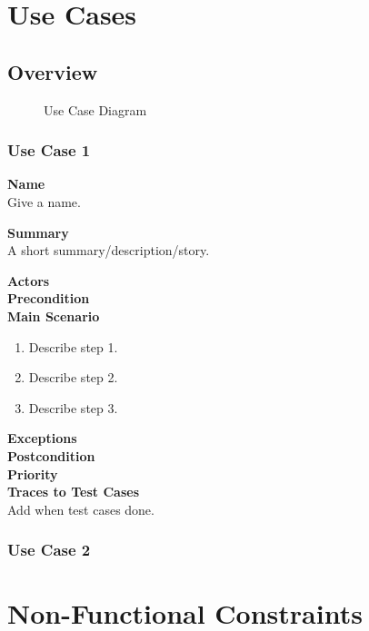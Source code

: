 \documentclass[12pt]{article}
\begin{document}
\section{Use Cases}

\subsection{Overview}

\begin{figure}[htbp]
\caption{Use Case Diagram}
\label{fig:use-case-diagram}
\end{figure}

\subsubsection{Use Case 1} \label{uc:1}

\noindent
{\bf Name}\\
Give a name.

\noindent
{\bf Summary}\\
A short summary/description/story.

\noindent
{\bf Actors}\\

\noindent
{\bf Precondition}\\

\noindent
{\bf Main Scenario}\\
\vspace*{-0.2in}
\begin{enumerate}
\item Describe step 1.
\item Describe step 2.
\item Describe step 3.
\end{enumerate}

\noindent
{\bf Exceptions}\\

\noindent
{\bf Postcondition}\\

\noindent
{\bf Priority}\\

\noindent
{\bf Traces to Test Cases}\\
Add when test cases done.

\subsubsection{Use Case 2} \label{uc:2}

\section{Non-Functional Constraints}
\end{document}

